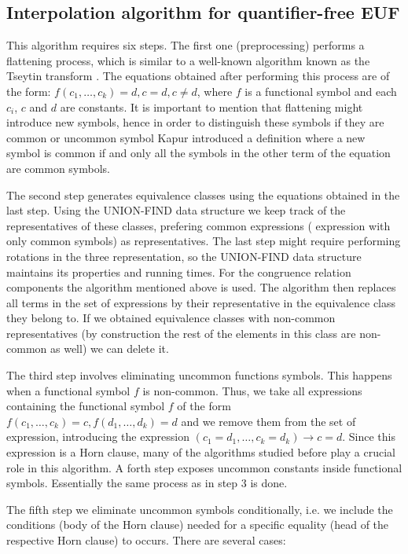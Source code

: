 \subsection{Interpolation algorithm for quantifier-free EUF}

This algorithm requires six steps. The first one (preprocessing) performs a flattening process,
which is similar to a well-known algorithm known as the Tseytin transform \cite{Tseitin1983}.
The equations obtained after performing this process are of the form: $f(c_1, \dots, c_k) = d, c = d, c \neq d$,
where $f$ is a functional symbol and each $c_i$, $c$ and $d$ are constants. It is important to mention
that flattening might introduce new symbols, hence in order to distinguish these symbols if they are common
or uncommon symbol Kapur introduced a definition where a new symbol is common if and only all the symbols
in the other term of the equation are common symbols.

The second step generates equivalence classes using the equations obtained in the last step. Using the
UNION-FIND data structure we keep track of the representatives of these classes, prefering common expressions (
expression with only common symbols) as representatives. The last step might require performing
rotations in the three representation, so the UNION-FIND data structure maintains its properties and running
times. For the congruence relation components the algorithm mentioned above is used. The algorithm then replaces
all terms in the set of expressions by their representative in the equivalence class they belong to. If
we obtained equivalence classes with non-common representatives (by construction
the rest of the elements in this class are non-common as well) we can delete it.

The third step involves eliminating uncommon functions symbols. This happens when a functional symbol
$f$ is non-common. Thus, we take all expressions containing the functional symbol $f$ of the form
$f(c_1, \dots, c_k) = c, f(d_1, \dots, d_k) = d$ and we remove them from the set of expression, introducing
the expression $(c_1 = d_1, \dots, c_k = d_k) \rightarrow c = d$. Since this expression is a Horn clause,
many of the algorithms studied before play a crucial role in this algorithm. A forth step exposes uncommon
constants inside functional symbols. Essentially the same process as in step 3 is done.

The fifth step we eliminate uncommon symbols conditionally, i.e. we include the conditions (body of the
Horn clause) needed for a specific equality (head of the respective Horn clause)
to occurs. There are several cases:

